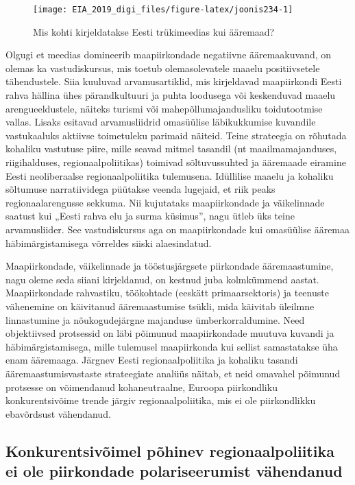 \documentclass[]{book}
\begin{document}
\begin{figure}

{\centering \texttt{[image: EIA\_2019\_digi\_files/figure-latex/joonis234-1]} 

}

\caption{Mis kohti kirjeldatakse Eesti trükimeedias kui ääremaad?}\label{fig:joonis234}
\end{figure}

Olgugi et meedias domineerib maapiirkondade negatiivne ääremaakuvand, on olemas ka vastudiskursus, mis
toetub olemasolevatele maaelu positiivsetele tähendustele. Siia kuuluvad arvamusartiklid, mis kirjeldavad
maapiirkondi Eesti rahva hällina ühes pärandkultuuri ja puhta loodusega või keskenduvad maaelu
arengueeldustele, näiteks turismi või mahepõllumajandusliku toidutootmise vallas. Lisaks esitavad
arvamusliidrid omasüülise läbikukkumise kuvandile vastukaaluks aktiivse toimetuleku parimaid näiteid. Teine
strateegia on rõhutada kohaliku vastutuse piire, mille seavad mitmel tasandil (nt maailmamajanduses,
riigihalduses, regionaalpoliitikas) toimivad sõltuvussuhted ja ääremaade eiramine Eesti neoliberaalse
regionaalpoliitika tulemusena. Idüllilise maaelu ja kohaliku sõltumuse narratiividega püütakse veenda
lugejaid, et riik peaks regionaalarengusse sekkuma. Nii kujutataks maapiirkondade ja väikelinnade saatust
kui „Eesti rahva elu ja surma küsimus'', nagu ütleb üks teine arvamusliider. See vastudiskursus aga on
maapiirkondade kui omasüülise ääremaa häbimärgistamisega võrreldes siiski alaesindatud.

Maapiirkondade, väikelinnade ja tööstusjärgsete piirkondade ääremaastumine, nagu oleme seda siiani
kirjeldanud, on kestnud juba kolmkümmend aastat. Maapiirkondade rahvastiku, töökohtade (eeskätt
primaarsektoris) ja teenuste vähenemine on käivitanud ääremaastumise tsükli, mida käivitab üleilmne
linnastumine ja nõukogudejärgne majanduse ümberkorraldumine. Need objektiivsed protsessid on läbi
põimunud maapiirkondade muutuva kuvandi ja häbimärgistamisega, mille tulemusel maapiirkonda kui sellist
samastatakse üha enam ääremaaga. Järgnev Eesti regionaalpoliitika ja kohaliku tasandi
ääremaastumisvastaste strateegiate analüüs näitab, et neid omavahel põimunud protsesse on võimendanud
kohaneutraalne, Euroopa piirkondliku konkurentsivõime trende järgiv regionaalpoliitika, mis ei ole
piirkondlikku ebavõrdsust vähendanud.

\hypertarget{konkurentsivoimel-pohinev-regionaalpoliitika-ei-ole-piirkondade-polariseerumist-vahendanud}{%
\subsection{Konkurentsivõimel põhinev regionaalpoliitika ei ole piirkondade polariseerumist vähendanud}\label{konkurentsivoimel-pohinev-regionaalpoliitika-ei-ole-piirkondade-polariseerumist-vahendanud}}
\end{document}
